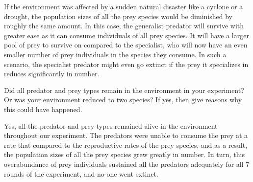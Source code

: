 \documentclass{scrartcl}
\begin{document}
\begin{solution*}
If the environment was affected by a sudden natural disaster like a cyclone or a drought, the population sizes of all the prey species would be diminished by roughly the same amount. In this case, the generalist predator will survive with greater ease as it can consume individuals of all prey species. It will have a larger pool of prey to survive on compared to the specialist, who will now have an even smaller number of prey individuals in the species they consume. In such a scenario, the specialist predator might even go extinct if the prey it specializes in reduces significantly in number.
\end{solution*}

\begin{question}
    Did all predator and prey types remain in the environment in your experiment? Or was your environment reduced to two species? If yes, then give reasons why this could have happened.
\end{question}

\begin{solution*}
Yes, all the predator and prey types remained alive in the environment throughout our experiment. The predators were unable to consume the prey at a rate that compared to the reproductive rates of the prey species, and as a result, the population sizes of all the prey species grew greatly in number. In turn, this overabundance of prey individuals sustained all the predators adequately for all 7 rounds of the experiment, and no-one went extinct.
\end{solution*}
\end{document}
